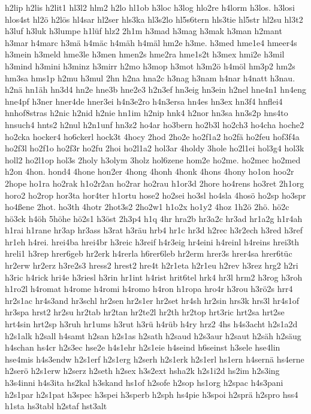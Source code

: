 {h2lip
h2lis
h2lit1
hl3l2
hlm2
h2lo
hl1ob
h3loc
h3log
hlo2re
h4lorm
h3los.
h3losi
hlos4st
hl2ö
h2lös
hl4sar
hl2ser
hls3ka
hl3s2lo
hl5s6tern
hls3tie
hl5str
hl2su
hl3t2
h3luf
h3luk
h3lumpe
h1lüf
hlz2
2h1m
h3mad
h3mag
h3mak
h3man
h2mant
h3mar
h4marc
h3mä
h4mäc
h4mäh
h4mäl
hm2e
h3me.
h3med
hme1e4
hmeer4s
h3mein
h3meld
hme3le
h3men
hmen2s
hme2ra
hme1s2t
h3mex
hmi2e
h3mil
h3mind
h3mini
h3minz
h3mirr
h2mo
h3mop
h3mot
h3m2ö
h4möl
hm3p2
hm2s
hm3sa
hms1p
h2mu
h3mul
2hn
h2na
hna2c
h3nag
h3nam
h4nar
h4natt
h3nau.
h2nä
hn1äh
hn3d4
hn2e
hne3b
hne2e3
h2n3ef
hn3eig
hn3ein
h2nel
hne4n1
hn4eng
hne4pf
h3ner
hner4de
hner3ei
h4n3e2ro
h4n3ersa
hn4es
hn3ex
hn3f4
hnflei4
hnhof8stras
h2nic
h2nid
h2nie
hn1im
h2nip
hnk4
h2nor
hn3sa
hn3s2p
hns4to
hnsuch4
hnts2
h2nul
h2n1unf
hn3z2
ho4ar
ho3bern
ho2b3l
ho2ch3
ho4cha
hoche2
ho2cka
hocker4
ho6ckerl
hock3t
4hocy
2hod
2ho2e
ho2f1a2
ho2fä
ho2feu
hof3f4a
ho2f3l
ho2f1o
ho2f3r
ho2fu
2hoi
ho2l1a2
hol3ar
4holdy
3hole
ho2l1ei
hol3g4
hol3k
holl2
ho2l1op
hol3s
2holy
h3olym
3holz
hol6zene
hom2e
ho2me.
ho2mec
ho2med
h2on
4hon.
hond4
4hone
hon2er
4hong
4honh
4honk
4hons
4hony
ho1on
hoo2r
2hope
ho1ra
ho2rak
h1o2r2an
ho2rar
ho2rau
h1or3d
2hore
ho4rens
ho3ret
2h1org
horo2
ho2rop
hor3ta
hor4ter
h1ortu
hose2
ho2sei
ho3sl
ho4sla
4hosö
ho2sp
ho3spr
ho4ßene
2hot.
ho3th
4hotr
2hot3s2
2ho2w1
h1o2x
ho1y2
4hoz
1h2ö
2hö.
hö2c
hö3ck
h4öh
5höhe
hö2s1
h3öst
2h3p4
h1q
4hr
hra2b
hr3a2c
hr3ad
hr1a2g
h1r4ah
h1rai
h1rane
hr3ap
hr3ass
h3rat
h3räu
hrb4
hr1c
hr3d
h2rec
h3r2ech
h3red
h3ref
hr1eh
h4rei.
hrei4ba
hrei4br
h3reic
h3reif
h4r3eig
hr4eini
h4reinl
h4reins
hrei3th
hreli1
h3rep
hrer6geb
hr2erk
h4rerla
h6rer6leb
hr2erm
hrer3s
hrer4sa
hrer6tüc
hr2erw
hr2erz
h3re2s3
hress2
hrest2
hre4t
h2r1eta
h2r1eu
h2rev
h3rez
hrg2
h2ri
h3ric
h4rick
hri4e
h3riesl
h3rin
hr1int
h4rist
hrit6tel
hrk4
hr3l
hrm2
h3rog
h3roh
h1ro2l
h4romat
h4rome
h4romi
h4romo
h4ron
h1ropa
hro4r
h3rou
h3rö2s
hrr4
hr2s1ac
hr4s3and
hr3schl
hr2sen
hr2s1er
hr2set
hr4sh
hr2sin
hrs3k
hrs3l
hr4s1of
hr3spa
hrst2
hr2su
hr2tab
hr2tan
hr2te2l
hr2th
hr2top
hrt3ric
hrt2sa
hrt2se
hrt4sin
hrt2sp
h3ruh
hr1ums
h3rut
h3rü
h4rüb
h4ry
hrz2
4hs
h4s3acht
h2s1a2d
h2s1alk
h2sall
h4samt
h2san
h2s1as
h2sath
h2saud
h2s3aur
h2saut
h2säh
h2säug
h4schan
hs4cr
h2s3ec
hse2e
h4s1ehr
h2s1eie
h4seind
h6seinst
h3sele
hse4lin
hse4mis
h4s3endw
h2s1erf
h2s1erg
h2serh
h2s1erk
h2s1erl
hs1ern
h4sernä
hs4erne
h2serö
h2s1erw
h2serz
h2seth
h2sex
h3s2ext
hsha2k
h2s1i2d
hs2im
h2s3ing
h3s4inni
h4s3ita
hs2kal
h3skand
hs1of
h2sofe
h2sop
hs1org
h2spac
h4s3pani
h2s1par
h2s1pat
h3spec
h3spei
h3sperb
h2sph
hs4pie
h3spoi
h2sprä
h2spro
hss4
h1sta
hs3tabl
h2staf
hst3alt
}
